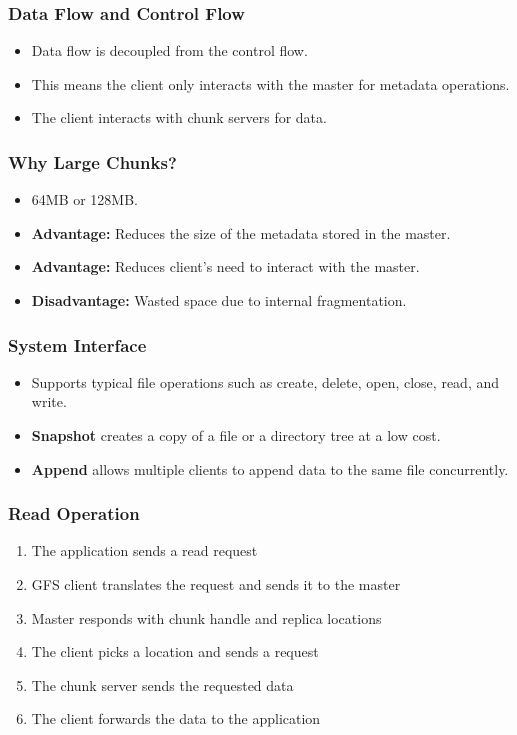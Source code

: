 \documentclass[12pt]{article}
\begin{document}
\subsubsection{Data Flow and Control Flow}
\begin{itemize}
    \item Data flow is decoupled from the control flow.
    \item This means the client only interacts with the master for metadata operations.
    \item The client interacts with chunk servers for data.
\end{itemize}

\subsubsection{Why Large Chunks?}
\begin{itemize}
    \item 64MB or 128MB.
    \item \textbf{Advantage:} Reduces the size of the metadata stored in the master.
    \item \textbf{Advantage:} Reduces client's need to interact with the master.
    \item \textbf{Disadvantage:} Wasted space due to internal fragmentation.
\end{itemize}

\subsubsection{System Interface}
\begin{itemize}
    \item Supports typical file operations such as create, delete, open, close, read, and write.
    \item \textbf{Snapshot} creates a copy of a file or a directory tree at a low cost.
    \item \textbf{Append} allows multiple clients to append data to the same file concurrently.
\end{itemize}

\subsubsection{Read Operation}
\begin{enumerate}
    \item The application sends a read request
    \item GFS client translates the request and sends it to the master
    \item Master responds with chunk handle and replica locations
    \item The client picks a location and sends a request
    \item The chunk server sends the requested data
    \item The client forwards the data to the application
\end{enumerate}
\end{document}
